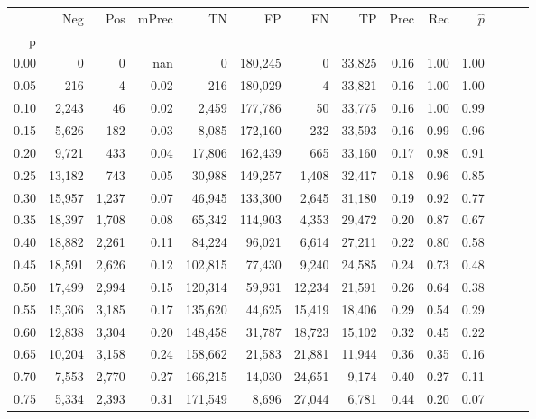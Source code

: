 \begin{tabular}{rrrrrrrrrrrrrr}
\toprule
{} &     Neg &    Pos & mPrec &       TN &       FP &      FN &      TP &  Prec &   Rec & $\hat{p}$ \\
p    &         &        &       &          &          &         &         &       &       &           \\
\midrule
0.00 &       0 &      0 &   nan &        0 &  180,245 &       0 &  33,825 &  0.16 &  1.00 &      1.00 \\
0.05 &     216 &      4 &  0.02 &      216 &  180,029 &       4 &  33,821 &  0.16 &  1.00 &      1.00 \\
0.10 &   2,243 &     46 &  0.02 &    2,459 &  177,786 &      50 &  33,775 &  0.16 &  1.00 &      0.99 \\
0.15 &   5,626 &    182 &  0.03 &    8,085 &  172,160 &     232 &  33,593 &  0.16 &  0.99 &      0.96 \\
0.20 &   9,721 &    433 &  0.04 &   17,806 &  162,439 &     665 &  33,160 &  0.17 &  0.98 &      0.91 \\
0.25 &  13,182 &    743 &  0.05 &   30,988 &  149,257 &   1,408 &  32,417 &  0.18 &  0.96 &      0.85 \\
0.30 &  15,957 &  1,237 &  0.07 &   46,945 &  133,300 &   2,645 &  31,180 &  0.19 &  0.92 &      0.77 \\
0.35 &  18,397 &  1,708 &  0.08 &   65,342 &  114,903 &   4,353 &  29,472 &  0.20 &  0.87 &      0.67 \\
0.40 &  18,882 &  2,261 &  0.11 &   84,224 &   96,021 &   6,614 &  27,211 &  0.22 &  0.80 &      0.58 \\
0.45 &  18,591 &  2,626 &  0.12 &  102,815 &   77,430 &   9,240 &  24,585 &  0.24 &  0.73 &      0.48 \\
0.50 &  17,499 &  2,994 &  0.15 &  120,314 &   59,931 &  12,234 &  21,591 &  0.26 &  0.64 &      0.38 \\
0.55 &  15,306 &  3,185 &  0.17 &  135,620 &   44,625 &  15,419 &  18,406 &  0.29 &  0.54 &      0.29 \\
0.60 &  12,838 &  3,304 &  0.20 &  148,458 &   31,787 &  18,723 &  15,102 &  0.32 &  0.45 &      0.22 \\
0.65 &  10,204 &  3,158 &  0.24 &  158,662 &   21,583 &  21,881 &  11,944 &  0.36 &  0.35 &      0.16 \\
0.70 &   7,553 &  2,770 &  0.27 &  166,215 &   14,030 &  24,651 &   9,174 &  0.40 &  0.27 &      0.11 \\
0.75 &   5,334 &  2,393 &  0.31 &  171,549 &    8,696 &  27,044 &   6,781 &  0.44 &  0.20 &      0.07 \\

\end{tabular}
